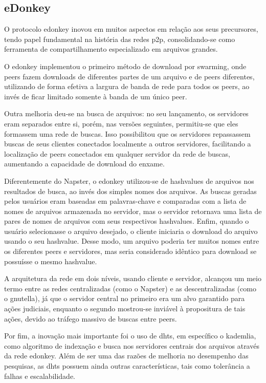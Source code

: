 \subsection*{eDonkey}

O protocolo \gls{edonkey} inovou em muitos aspectos em relação aos seus precursores,
tendo papel fundamental na história das redes \gls*{p2p}, consolidando-se como
ferramenta de compartilhamento especializado em arquivos grandes.

O \gls*{edonkey} implementou o primeiro método de download por \gls{swarming}, onde
\glspl*{peer} fazem downloads de diferentes partes de um arquivo e de \glspl*{peer}
diferentes, utilizando de forma efetiva a largura de banda de rede para todos os
\glspl*{peer}, ao invés de ficar limitado somente à banda de um único \gls*{peer}.

Outra melhoria deu-se na busca de arquivos: no seu lançamento, os servidores eram
separados entre si, porém, nas versões seguintes, permitiu-se que eles formassem uma
rede de buscas. Isso possibilitou que os servidores repassassem buscas de seus clientes
conectados localmente a outros servidores, facilitando a localização de \glspl*{peer}
conectados em qualquer servidor da rede de buscas, aumentando a capacidade de download
do enxame.

Diferentemente do Napster, o \gls*{edonkey} utilizou-se de \glspl{hashvalue} de arquivos
nos resultados de busca, ao invés dos simples nomes dos arquivos. As buscas geradas
pelos usuários eram baseadas em palavras-chave e comparadas com a lista de nomes de
arquivos armazenada no servidor, mas o servidor retornava uma lista de pares de nomes
de arquivos com seus respectivos \glspl*{hashvalue}. Enfim, quando o usuário
selecionasse o arquivo desejado, o cliente iniciaria o download do arquivo usando o seu
\gls*{hashvalue}. Desse modo, um arquivo poderia ter muitos nomes entre os diferentes
\glspl*{peer} e servidores, mas seria considerado idêntico para download se possuísse o
mesmo \gls*{hashvalue}.

A arquitetura da rede em dois níveis, usando cliente e servidor, alcançou um meio termo
entre as redes centralizadas (como o Napster) e as descentralizadas (como o
\gls*{gnutella}), já que o servidor central no primeiro era um alvo garantido para ações
judiciais, enquanto o segundo mostrou-se inviável à propositura de tais ações, devido
ao tráfego massivo de buscas entre \glspl*{peer}.

Por fim, a inovação mais importante foi o uso de \glspl{dht}, em específico o
\gls{kademlia}, como algoritmo de indexação e busca nos servidores centrais dos
arquivos através da rede \gls*{edonkey}. Além de ser uma das razões de melhoria no
desempenho das pesquisas, as \glspl*{dht} possuem ainda outras características, tais
como tolerância a falhas e escalabilidade.

